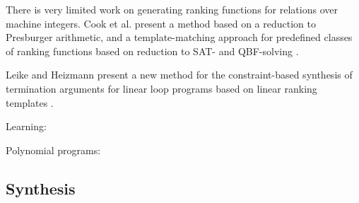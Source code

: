 \documentclass[preprint]{sigplanconf}
\theoremstyle{definition}
\begin{document}
There is very limited work on generating ranking functions for relations over machine integers.
Cook et al. present a method based on a reduction to Presburger
arithmetic, and a template-matching approach for predefined classes of
ranking functions based on reduction to SAT- and QBF-solving \cite{DBLP:conf/tacas/CookKRW10}.

Leike and Heizmann present a new method for the constraint-based synthesis
of termination arguments for linear loop programs based on
linear ranking templates \cite{DBLP:conf/tacas/LeikeH14}.

Learning: \cite{DBLP:journals/corr/HeizmannHP14}

Polynomial programs: \cite{DBLP:conf/vmcai/BradleyMS05}




\subsection{Synthesis}



\end{document}
